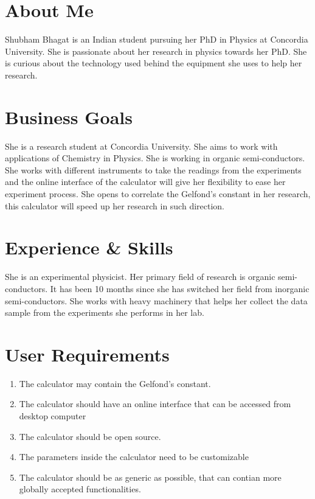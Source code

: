 \documentclass[letterpaper]{twentysecondcv}
\begin{document}
\makeprofile

\section{About Me}

Shubham Bhagat is an Indian student pursuing her PhD in Physics at Concordia University. She is passionate about her research in physics towards her PhD. She is curious about the technology used behind the equipment she uses to help her research. \newline

\section{Business Goals}

She is a research student at Concordia University. She aims to work with applications of Chemistry in Physics. She is working in organic semi-conductors. She works with different instruments to take the readings from the experiments and the online interface of the calculator will give her flexibility to ease her experiment process. She opens to correlate the Gelfond's constant in her research, this calculator will speed up her research in such direction. \newline

\section{Experience \& Skills}

She is an experimental physicist. Her primary field of research is organic semi-conductors. It has been 10 months since she has switched her field from inorganic semi-conductors. She works with heavy machinery that helps her collect the data sample from the experiments she performs in her lab.    \newline

\section{User Requirements}

\begin{enumerate}
 
   \item The calculator may contain the Gelfond's constant.
   \item The calculator should have an online interface that can be accessed from desktop computer
   \item The calculator should be open source.
   \item The parameters inside the calculator need to be customizable
   \item The calculator should be as generic as possible, that can contian more globally accepted functionalities.
    \newline  
\end{enumerate}
\end{document}
